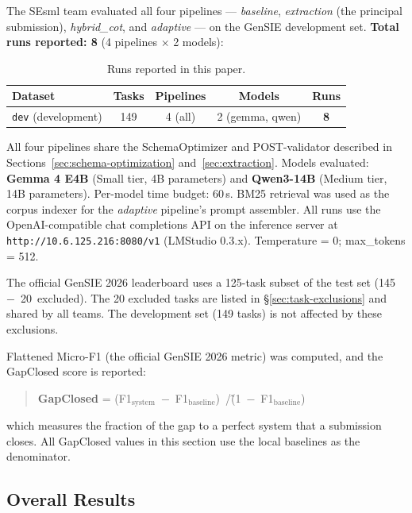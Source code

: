 \documentclass{ceurart}
\begin{document}
The SEsml team evaluated all four pipelines --- \emph{baseline}, \emph{extraction}
(the principal submission), \emph{hybrid\_cot}, and \emph{adaptive} --- on the GenSIE
development set.
\textbf{Total runs reported: 8} (4 pipelines $\times$ 2 models):

\begin{table}
  \caption{Runs reported in this paper.}
  \label{tab:runs}
  \centering
  \begin{tabular}{lcccc}
    \toprule
    Dataset & Tasks & Pipelines & Models & Runs \\
    \midrule
    \texttt{dev} (development) & 149 & 4 (all) & 2 (gemma, qwen) & \textbf{8} \\
    \bottomrule
  \end{tabular}
\end{table}

All four pipelines share the SchemaOptimizer and POST-validator described in
Sections~\ref{sec:schema-optimization} and~\ref{sec:extraction}.
Models evaluated: \textbf{Gemma 4 E4B} (Small tier, 4B parameters) and
\textbf{Qwen3-14B} (Medium tier, 14B parameters).
Per-model time budget: 60\,s.
BM25 retrieval was used as the corpus indexer for the \emph{adaptive} pipeline's prompt
assembler.
All runs use the OpenAI-compatible chat completions API on the inference server at
\texttt{http://10.6.125.216:8080/v1} (LMStudio 0.3.x).
Temperature = 0; max\_tokens = 512.

The official GenSIE 2026 leaderboard uses a 125-task subset of the test set
(145~$-$~20~excluded).
The 20 excluded tasks are listed in \S\ref{sec:task-exclusions} and shared by all
teams.
The development set (149 tasks) is not affected by these exclusions.

Flattened Micro-F1 (the official GenSIE 2026 metric) was computed, and the GapClosed
score is reported:

\begin{quote}
\textbf{GapClosed} = (F1$_{\text{system}}$~$-$~F1$_{\text{baseline}}$)~/\~(1~$-$~F1$_{\text{baseline}}$)
\end{quote}

which measures the fraction of the gap to a perfect system that a submission closes.
All GapClosed values in this section use the local baselines as the denominator.

\subsection{Overall Results}
\end{document}

